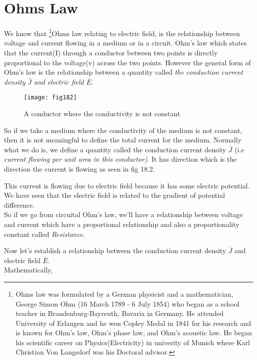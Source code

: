 \section{Ohms Law} 
We know that \footnote[4]{Ohms law was formulated by a German physicist and a mathematician, George Simon Ohm (16 March 1789 - 6 July 1854) who began as a school teacher in Brandenburg-Bayreuth, Bavaria in Germany. He attended University of Erlangen and he won Copley Medal in 1841 for his research and is known for Ohm's law, Ohm's phase law, and Ohm's acoustic law. He began his scientific career on Physics(Electricity) in univerity of Munich where Karl Christian Von Langsdorf was his Doctoral advisor.}Ohms law relating to electric field, is the relationship between voltage and current flowing in a medium or in a circuit. Ohm's law which states that the current(I) through a conductor between two points is directly proportional to the voltage(v) across the two points. However the general form of Ohm's law is the relationship between a quantity called \emph{the conduction current density $ \bar{J} $ and electric field $ \bar{E} $}. \\

\begin{figure}
	\centering
	\texttt{[image: fig182]}
	\caption{A conductor where the conductivity is not constant}
	\label{}
\end{figure}



So if we take a medium where the conductivity of the medium is not constant, then it is not meaningful to define the total current for the medium. Normally what we do is, we define a quantity called the conduction current density $ \bar{J} $ (i.e \emph{current flowing per unit area in this conductor)}. It has direction which is the direction the current is flowing as seen in fig 18.2. 

This current is flowing due to electric field because it has some electric potential. We have seen that the electric field is related to the gradient of potential difference. \\

So if we go from circuital Ohm's law, we'll have a relationship between voltage and current which have a proportional relationship and also a proportionality constant called \emph{Resistance}.

Now let's establish a relationship between the conduction current density $ \bar{J} $ and electric field $ \bar{E} $. \\
Mathematically, \\

